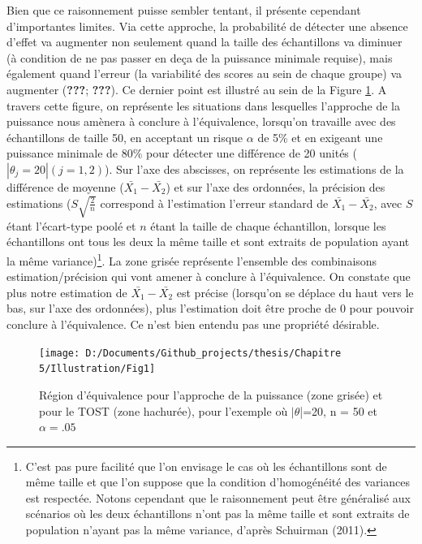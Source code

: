 \documentclass[
  english,
  man]{apa6}
\begin{document}
Bien que ce raisonnement puisse sembler tentant, il présente cependant d'importantes limites. Via cette approche, la probabilité de détecter une absence d'effet va augmenter non seulement quand la taille des échantillons va diminuer (à condition de ne pas passer en deça de la puissance minimale requise), mais également quand l'erreur (la variabilité des scores au sein de chaque groupe) va augmenter ({\textbf{???}}; {\textbf{???}}). Ce dernier point est illustré au sein de la Figure \ref{fig:schuirman}. A travers cette figure, on représente les situations dans lesquelles l'approche de la puissance nous amènera à conclure à l'équivalence, lorsqu'on travaille avec des échantillons de taille 50, en acceptant un risque \(\alpha\) de 5\% et en exigeant une puissance minimale de 80\% pour détecter une différence de 20 unités (\(|\theta_j=20| (j=1,2)\)). Sur l'axe des abscisses, on représente les estimations de la différence de moyenne (\(\bar{X_1}-\bar{X_2}\)) et sur l'axe des ordonnées, la précision des estimations (\(S\sqrt{\frac{2}{n}}\) correspond à l'estimation l'erreur standard de \(\bar{X_1}-\bar{X_2}\), avec \(S\) étant l'écart-type poolé et \(n\) étant la taille de chaque échantillon, lorsque les échantillons ont tous les deux la même taille et sont extraits de population ayant la même variance)\footnote{C'est pas pure facilité que l'on envisage le cas où les échantillons sont de même taille et que l'on suppose que la condition d'homogénéité des variances est respectée. Notons cependant que le raisonnement peut être généralisé aux scénarios où les deux échantillons n'ont pas la même taille et sont extraits de population n'ayant pas la même variance, d'après Schuirman (2011).}. La zone grisée représente l'ensemble des combinaisons estimation/précision qui vont amener à conclure à l'équivalence. On constate que plus notre estimation de \(\bar{X_1}-\bar{X_2}\) est précise (lorsqu'on se déplace du haut vers le bas, sur l'axe des ordonnées), plus l'estimation doit être proche de 0 pour pouvoir conclure à l'équivalence. Ce n'est bien entendu pas une propriété désirable.

\begin{figure}

{\centering \texttt{[image: D:/Documents/Github\_projects/thesis/Chapitre 5/Illustration/Fig1]} 

}

\caption{Région d'équivalence pour l'approche de la puissance (zone grisée) et pour le TOST (zone hachurée), pour l'exemple où $|\theta$|=20, n = 50 et $\alpha=.05$}\label{fig:schuirman}
\end{figure}
\end{document}
